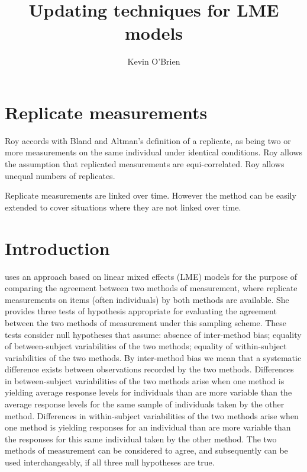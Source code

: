 \documentclass[Chap4main.tex]{subfiles}
\begin{document}
\author{Kevin O'Brien}
\title{Updating techniques for LME models}
\tableofcontents
{}

\section{Replicate measurements}
Roy accords with Bland and Altman’s definition of a replicate, as being two or more measurements on the same individual under identical conditions.
Roy allows the assumption that replicated measurements are equi-correlated.
Roy allows unequal numbers of replicates.

Replicate measurements are linked over time. However the method can be easily extended to cover situations where they are not linked over time.


\newpage
\section{Introduction}

\citet{roy} uses an approach based on linear mixed effects (LME) models for the purpose of comparing the agreement between two methods of measurement, where replicate measurements on items (often individuals) by both methods are available. She provides three tests of hypothesis appropriate for evaluating the agreement between the two methods of measurement under this sampling scheme. These tests consider null hypotheses that assume: absence of inter-method bias; equality of between-subject variabilities of the two methods; equality of within-subject variabilities of the two methods. By inter-method bias we mean that a systematic difference exists between observations recorded by the two methods. Differences in between-subject variabilities of the two methods arise when one method is yielding average response levels for individuals than are more variable than the average response levels for the same sample of individuals taken by the other method.  Differences in within-subject variabilities of the two methods arise when one method is yielding responses for an individual than are more variable than the responses for this same individual taken by the other method. The two methods of measurement can be considered to agree, and subsequently can be used interchangeably, if all three null hypotheses are true.

\bigskip
\end{document}
